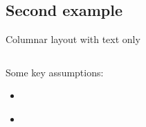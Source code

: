 \documentclass[aspectratio=169, 10pt]{beamer}
\begin{document}
\subsection{Second example}
\begin{frame}{Columnar layout with text only}
    \justifying
    \lipsum[1][1-5]\\[8ex]
  
    \begin{columns}
        \pause
        \centering
        \begin{column}{0.46\textwidth}
            \justifying
            Some key assumptions:
            \begin{itemize}
                \item \textit{\lipsum[1][6]}
                \item \textit{\lipsum[1][7]}
            \end{itemize}
            \vspace{0.2cm}
        \end{column}
        \pause
        \begin{column}{0.46\textwidth}
            \justifying
            \textbf{\lipsum[1][8-12]}
        \end{column}
    \end{columns}
\end{frame}
\end{document}
